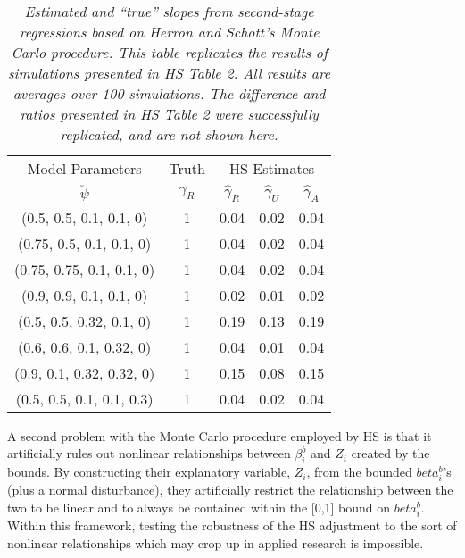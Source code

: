 \documentclass[11pt,titlepage]{article}
\begin{document}
\begin{table}[tb]
\label{t:hsrep}
\begin{center}
\begin{tabular}{cc|c c c}
Model Parameters & Truth & \multicolumn{3}{c}{HS Estimates} \\
$\breve\psi$  & $\gamma_R$ & $\hat\gamma_R$  &       $\hat\gamma_U$ & $\hat\gamma_A$ \\\hline
(0.5, 0.5, 0.1, 0.1, 0)&1 &       0.04    &       0.02    &       0.04        \\
(0.75, 0.5, 0.1, 0.1, 0) &1       &       0.04    &       0.02    &       0.04        \\
(0.75, 0.75, 0.1, 0.1, 0) &1      &       0.04    &       0.02    &       0.04     \\
(0.9, 0.9, 0.1, 0.1, 0) &1&       0.02    &       0.01    &       0.02          \\
(0.5, 0.5, 0.32, 0.1, 0) &1       &       0.19    &       0.13    &       0.19        \\
(0.6, 0.6, 0.1, 0.32, 0) &1       &       0.04    &       0.01    &       0.04     \\
(0.9, 0.1, 0.32, 0.32, 0)&1       &       0.15    &       0.08    &       0.15        \\
(0.5, 0.5, 0.1, 0.1, 0.3)&1       &       0.04    &       0.02    &       0.04     \\
\hline
\end{tabular}
\end{center}
\caption{\em Estimated and ``true'' slopes from 
second-stage regressions based on Herron and Schott's Monte Carlo 
procedure. This table replicates the results of simulations presented in
HS Table 2.  All results are averages over 100 simulations.  
The difference and ratios presented in HS Table 2 were  
successfully replicated, and are not shown here.}
\end{table}

A second problem with the Monte Carlo procedure employed by HS is that
it artificially rules out nonlinear relationships between $\beta_i^b$
and $Z_i$ created by the bounds.  By constructing their explanatory
variable, $Z_i$, from the bounded $beta_i^b$'s (plus a normal
disturbance), they artificially restrict the relationship between the
two to be linear and to always be contained within the [0,1] bound on
$beta_i^b$.  Within this framework, testing the robustness of the HS
adjustment to the sort of nonlinear relationships which may crop up in
applied research is impossible.
\end{document}
